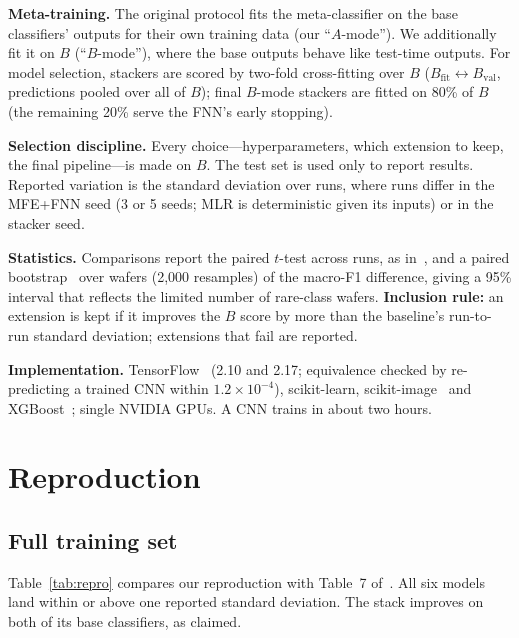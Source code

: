 \documentclass[conference]{IEEEtran}
\newcommand{\Bfit}{B_{\mathrm{fit}}}
\newcommand{\Bval}{B_{\mathrm{val}}}
\begin{document}
\textbf{Meta-training.} The original protocol fits the meta-classifier on the base classifiers' outputs for their own
training data (our ``$A$-mode''). We additionally fit it on $B$ (``$B$-mode''), where the base outputs behave like
test-time outputs. For model selection, stackers are scored by two-fold cross-fitting over $B$ ($\Bfit \leftrightarrow
\Bval$, predictions pooled over all of $B$); final $B$-mode stackers are fitted on 80\% of $B$ (the remaining 20\% serve
the FNN's early stopping).

\textbf{Selection discipline.} Every choice---hyperparameters, which extension to keep, the final pipeline---is made on
$B$. The test set is used only to report results. Reported variation is the standard deviation over runs, where runs
differ in the MFE+FNN seed (3 or 5 seeds; MLR is deterministic given its inputs) or in the stacker seed.

\textbf{Statistics.} Comparisons report the paired $t$-test across runs, as in~\cite{kang2021stacking}, and a paired
bootstrap~\cite{efron1993bootstrap} over wafers (2,000 resamples) of the macro-F1 difference, giving a 95\% interval
that reflects the limited number of rare-class wafers. \textbf{Inclusion rule:} an extension is kept if it improves the
$B$ score by more than the baseline's run-to-run standard deviation; extensions that fail are reported.

\textbf{Implementation.} TensorFlow~\cite{abadi2016tensorflow} (2.10 and 2.17; equivalence checked by re-predicting a
trained CNN within $1.2\times10^{-4}$), scikit-learn, scikit-image~\cite{vanderwalt2014skimage} and
XGBoost~\cite{chen2016xgboost}; single NVIDIA GPUs. A CNN trains in about two hours.

\section{Reproduction}
\label{sec:repro}
\subsection{Full training set}
Table~\ref{tab:repro} compares our reproduction with Table~7 of~\cite{kang2021stacking}. All six models land within or
above one reported standard deviation. The stack improves on both of its base classifiers, as claimed.
\end{document}
